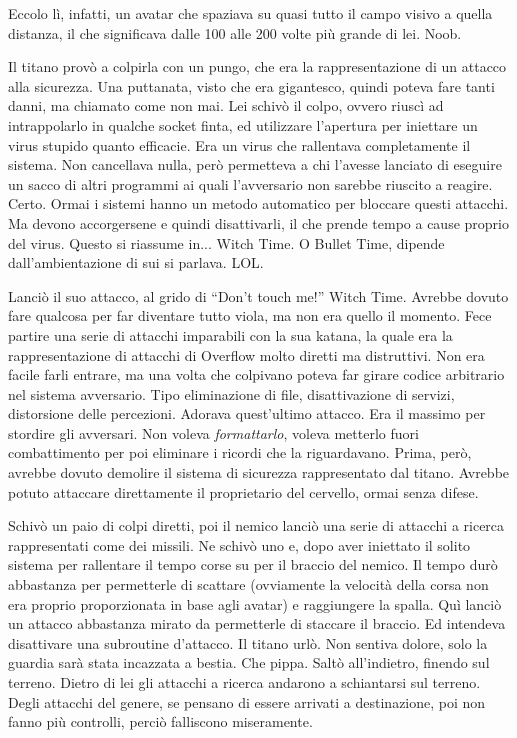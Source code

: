     Eccolo lì, infatti, un avatar che spaziava su quasi tutto il campo visivo a quella distanza, il che significava
    dalle 100 alle 200 volte più grande di lei. Noob.

    Il titano provò a colpirla con un pungo, che era la rappresentazione di un attacco alla sicurezza. Una puttanata,
    visto che era gigantesco, quindi poteva fare tanti danni, ma chiamato come non mai. Lei schivò il colpo, ovvero
    riuscì ad intrappolarlo in qualche socket finta, ed utilizzare l'apertura per iniettare un virus stupido quanto
    efficacie. Era un virus che rallentava completamente il sistema. Non cancellava nulla, però permetteva a chi
    l'avesse lanciato di eseguire un sacco di altri programmi ai quali l'avversario non sarebbe riuscito a reagire.
    Certo. Ormai i sistemi hanno un metodo automatico per bloccare questi attacchi. Ma devono accorgersene e quindi
    disattivarli, il che prende tempo a cause proprio del virus. Questo si riassume in... Witch Time. O Bullet Time,
    dipende dall'ambientazione di sui si parlava. LOL.

    Lanciò il suo attacco, al grido di ``Don't touch me!'' Witch Time. Avrebbe dovuto fare qualcosa per far diventare
    tutto viola, ma non era quello il momento. Fece partire una serie di attacchi imparabili con la sua katana, la quale
    era la rappresentazione di attacchi di Overflow molto diretti ma distruttivi. Non era facile farli entrare, ma una
    volta che colpivano poteva far girare codice arbitrario nel sistema avversario. Tipo eliminazione di file,
    disattivazione di servizi, distorsione delle percezioni. Adorava quest'ultimo attacco. Era il massimo per stordire
    gli avversari. Non voleva \emph{formattarlo}, voleva metterlo fuori combattimento per poi eliminare i ricordi che la
    riguardavano. Prima, però, avrebbe dovuto demolire il sistema di sicurezza rappresentato dal titano. Avrebbe potuto
    attaccare direttamente il proprietario del cervello, ormai senza difese.

    Schivò un paio di colpi diretti, poi il nemico lanciò una serie di attacchi a ricerca rappresentati come dei
    missili. Ne schivò uno e, dopo aver iniettato il solito sistema per rallentare il tempo corse su per il braccio
    del nemico. Il tempo durò abbastanza per permetterle di scattare (ovviamente la velocità della corsa non era proprio
    proporzionata in base agli avatar) e raggiungere la spalla. Quì lanciò un attacco abbastanza mirato da permetterle
    di staccare il braccio. Ed intendeva disattivare una subroutine d'attacco. Il titano urlò. Non sentiva dolore, solo
    la guardia sarà stata incazzata a bestia. Che pippa. Saltò all'indietro, finendo sul terreno. Dietro di lei gli
    attacchi a ricerca andarono a schiantarsi sul terreno. Degli attacchi del genere, se pensano di essere arrivati a
    destinazione, poi non fanno più controlli, perciò falliscono miseramente.

